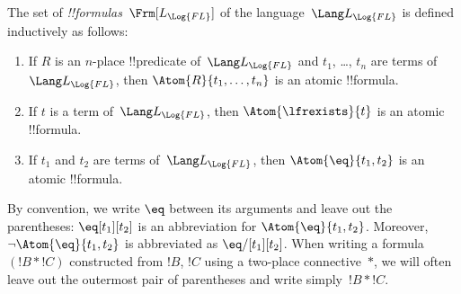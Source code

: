 \documentclass[../../../include/open-logic-section]{subfiles}
\begin{document}
\begin{defn}[Formula]
The set of \emph{!!{formula}s}~$\Frm[L_{\Log{FL}}]$ of the language~$\Lang L_{\Log{FL}}$
is defined inductively as follows:
\begin{enumerate}


\item If $R$ is an $n$-place !!{predicate} of~$\Lang L_{\Log{FL}}$ and $t_1$, \dots,
  $t_n$ are terms of~$\Lang L_{\Log{FL}}$, then $\Atom{R}{t_1,\ldots, t_n}$ is an
  atomic !!{formula}.

\item If $t$ is a term of~$\Lang L_{\Log{FL}}$, then $\Atom{\lfrexists}{t}$
  is an atomic !!{formula}.

\item If $t_1$ and $t_2$ are terms of~$\Lang L_{\Log{FL}}$, then $\Atom{\eq}{t_1, t_2}$
  is an atomic !!{formula}.








\end{enumerate}
\end{defn}

By convention, we write $\eq$ between its arguments and leave out the
parentheses: $\eq[t_1][t_2]$ is an abbreviation for
$\Atom{\eq}{t_1,t_2}$.  Moreover, $\lnot \Atom{\eq}{t_1,t_2}$ is
abbreviated as $\eq/[t_1][t_2]$. When writing a formula $(!B \ast !C)$
constructed from $!B$, $!C$ using a two-place connective~$\ast$, we
will often leave out the outermost pair of parentheses and write
simply~$!B \ast !C$.
\end{document}
